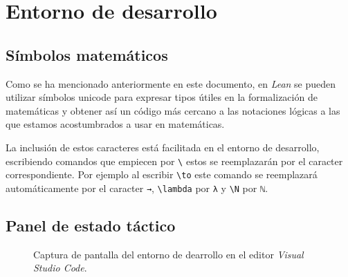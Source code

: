 \section{Entorno de desarrollo}\label{sec:entorno}


\subsection*{Símbolos matemáticos}

Como se ha mencionado anteriormente en este documento, en \textit{Lean} se
pueden utilizar símbolos unicode para expresar tipos útiles en la formalización
de matemáticas y obtener así un código más cercano a las notaciones lógicas a
las que estamos acostumbrados a usar en matemáticas.

La inclusión de estos caracteres está facilitada en el entorno de
desarrollo, escribiendo comandos que empiecen por \texttt{\textbackslash} estos
se reemplazarán por el caracter correspondiente. Por ejemplo al escribir
\texttt{\textbackslash to} este comando se reemplazará automáticamente por el
caracter \lstinline{→}, \texttt{\textbackslash lambda} por \lstinline{λ} y
\texttt{\textbackslash N} por \lstinline{ℕ}.

\subsection*{Panel de estado táctico}


\begin{figure}[htbp]
	\centerline{}
	\caption*{Captura de pantalla del entorno de dearrollo en el editor \textit{Visual Studio Code}.}
	\label{figure:entorno}
\end{figure}



